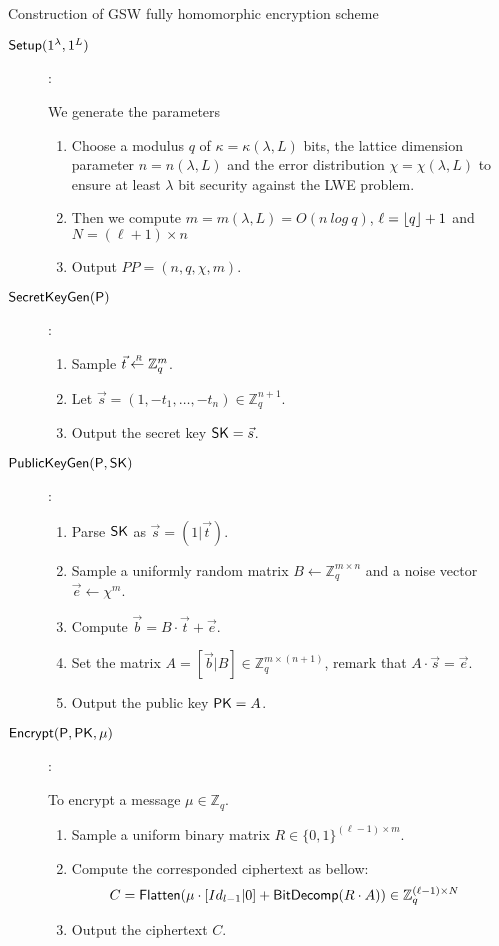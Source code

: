 \begin{section}{Construction of GSW fully homomorphic encryption scheme}
  
  \begin{description}
  \item[${\mathsf{Setup}}(1^\lambda, 1^L)$]:
    
    We generate the parameters 
    
    \begin{enumerate}
    \item Choose a modulus $q$ of $\kappa = \kappa(\lambda, L)$ bits, the lattice dimension parameter $n = n (\lambda, L)$ and the error distribution $\chi = \chi(\lambda, L)$ to ensure at least $\lambda$ bit security against the LWE problem.
    \item Then we compute $m = m (\lambda, L) = O (n~log~q)$, $\ell = \lfloor q\rfloor + 1$ and $N = (\ell + 1) \times n$
    \item Output $PP = (n, q, \chi, m)$.
    \end{enumerate}

  \item[${\mathsf{SecretKeyGen}}(\mathsf{P})$]:
    \begin{enumerate}
    \item Sample $\vec{t} \stackrel{{\scriptscriptstyle \mkern4mu R}}{\gets} \mathbb{Z}_q^m$.
    \item Let $\vec{s} = (1, -t_1, \dots, -t_n) \in \mathbb{Z}_q^{n+1}$.
    \item Output the secret key $\mathsf{SK} = \vec{s}$.
    \end{enumerate}
    
  \item[${\mathsf{PublicKeyGen}}(\mathsf{P}, \mathsf{SK})$]:
    \begin{enumerate}
    \item Parse $\mathsf{SK}$ as $\vec{s} = (1 | \vec{t})$.
    \item Sample a uniformly random matrix $B  \gets \mathbb{Z}_q^{m\times n}$ and a noise vector $\vec{e} \gets \chi^{m}$.
    \item Compute $\vec{b} = B \cdot \vec{t} + \vec{e}$. 
    \item Set the matrix $A = [\vec{b} | B ] \in \mathbb{Z}_q^{m \times (n+1)}$, remark that $A \cdot \vec{s} = \vec{e}$.
    \item Output the public key $\mathsf{PK} = A$.
    \end{enumerate}

  \item[${\mathsf{Encrypt}}(\mathsf{P}, \mathsf{PK}, \mu)$]:
    
    To encrypt a message $\mu \in \mathbb{Z}_q$.
    \begin{enumerate}
    \item Sample a uniform binary matrix $R \in \{0,1\}^{(\ell-1) \times m}$.
    \item Compute the corresponded ciphertext as bellow:
      \begin{align*}
        C &= {\mathsf{Flatten}}(\mu \cdot [Id_{l-1}| 0] + {\mathsf{BitDecomp}}(R \cdot A)) \in \mathbb{Z}_q^{(\ell-1) \times N}
      \end{align*}
    \item Output the ciphertext $C$.
    \end{enumerate}


\end{description}
\end{section}
